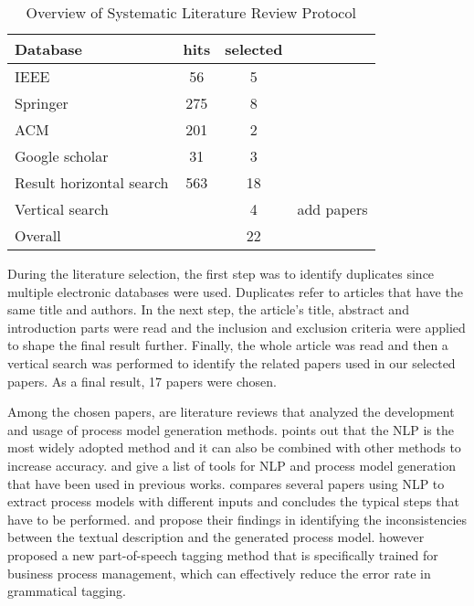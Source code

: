 	\begin{table}[]
		\begin{center}
		\caption{\centering Overview of Systematic Literature Review Protocol}
		\begin{tabular}{lccl}
    	\textbf{Database}\hspace{30mm} & \textbf{hits} & \textbf{selected} &  \\
    	\hline
		IEEE                     		& 56   & 5   &      		\\
		Springer                 		& 275  & 8   &      		\\
		ACM                      		& 201  & 2   &      		\\
		Google scholar           		& 31   & 3   &      		\\
		\hline
		Result horizontal search	 	& 563  & 18  &      		\\
		Vertical search          		&      & 4   &  \hspace{5mm}add papers  \\
		\hline
		Overall                  		&      & 22   &     
		\end{tabular}
		\end{center}
	\end{table}
	
	During the literature selection, the first step was to identify duplicates since multiple electronic databases were used. Duplicates refer to articles that have the same title and authors. In the next step, the article's title, abstract and introduction parts were read and the inclusion and exclusion criteria were applied to shape the final result further. Finally, the whole article was read and then a vertical search was performed to identify the related papers used in our selected papers. As a final result, 17 papers were chosen. 
	
	Among the chosen papers, \cite{literature_review_1} \cite{literature_review_2} \cite{literature_review_3} \cite{literature_review_4} are literature reviews that analyzed the development and usage of process model generation methods. \cite{literature_review_3} points out that the NLP is the most widely adopted method and it can also be combined with other methods to increase accuracy. \cite{literature_review_1} and \cite{literature_review_3} give a list of tools for NLP and process model generation that have been used in previous works. \cite{literature_review_4} compares several papers using NLP to extract process models with different inputs and concludes the typical steps that have to be performed. \cite{complement_2} and \cite{complement_3} propose their findings in identifying the inconsistencies between the textual description and the generated process model. \cite{complement_4} however proposed a new part-of-speech tagging method that is specifically trained for business process management, which can effectively reduce the error rate in grammatical tagging.
	
